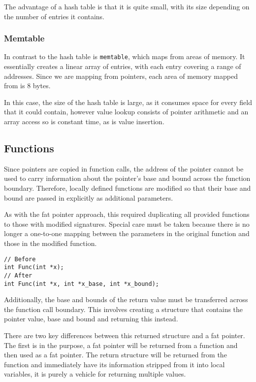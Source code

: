 The advantage of a hash table is that it is quite small, with its size depending on the number of entries it contains.

\subsubsection{Memtable}

In contrast to the hash table is \verb!memtable!, which maps from areas of memory.
It essentially creates a linear array of entries, with each entry covering a range of addresses.
Since we are mapping from pointers, each area of memory mapped from is 8 bytes.

In this case, the size of the hash table is large, as it consumes space for every field that it could contain, however value lookup consists of pointer arithmetic and an array access so is constant time, as is value insertion.
\subsection{Functions}

Since pointers are copied in function calls, the address of the pointer cannot be used to carry information about the pointer's base and bound across the function boundary.
Therefore, locally defined functions are modified so that their base and bound are passed in explicitly as additional parameters.

As with the fat pointer approach, this required duplicating all provided functions to those with modified signatures.
Special care must be taken because there is no longer a one-to-one mapping between the parameters in the original function and those in the modified function.

\begin{verbatim}
// Before
int Func(int *x);
// After
int Func(int *x, int *x_base, int *x_bound);
\end{verbatim}

Additionally, the base and bounds of the return value must be transferred across the function call boundary.
This involves creating a structure that contains the pointer value, base and bound and returning this instead.

There are two key differences between this returned structure and a fat pointer.
The first is in the purpose, a fat pointer will be returned from a function and then used as a fat pointer.
The return structure will be returned from the function and immediately have its information stripped from it into local variables, it is purely a vehicle for returning multiple values.

